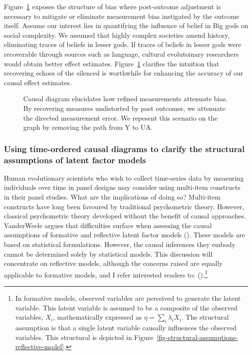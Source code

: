 \documentclass[
  singlecolumn]{article}
\begin{document}
Figure~\ref{fig-dag-measure-selection} exposes the structure of bias
where post-outcome adjustment is necessary to mitigate or eliminate
measurement bias instigated by the outcome itself. Assume our interest
lies in quantifying the influence of belief in Big gods on social
complexity. We assumed that highly complex societies amend history,
eliminating traces of beliefs in lesser gods. If traces of beliefs in
lesser gods were recoverable through sources such as language, cultural
evolutoinary researchers would obtain better effect estimates.
Figure~\ref{fig-dag-measure-selection} clarifies the intuition that
recovering echoes of the silenced is worthwhile for enhancing the
accuracy of our causal effect estimates.

\begin{figure}


\caption{\label{fig-dag-measure-selection}Causal diagram elucidates how
refined measurements attenuate bias. By recovering measures undistorted
by past outcomes, we attenuate the directed measurement error. We
repesent this scenario on the graph by removing the path from Y to UA.}

\end{figure}%

\subsubsection{Using time-ordered causal diagrams to clarify the
structural assumptions of latent factor
models}\label{using-time-ordered-causal-diagrams-to-clarify-the-structural-assumptions-of-latent-factor-models}

Human evolutionary scientists who wish to collect time-series data by
measuring individuals over time in panel designs may consider using
multi-item constructs in their panel studies. What are the implications
of doing so? Multi-item constructs have long been favoured by
traditional psychometric theory. However, classical psychometric theory
developed without the benefit of causal approaches. VanderWeele argues
that difficulties surface when assessing the causal assumptions of
formative and reflective latent factor models
(). These models are
based on statistical formulations. However, the causal inferences they
embody cannot be determined solely by statistical models. This
discussion will concentrate on reflective models, although the concerns
raised are equally applicable to formative models, and I refer
interested readers to: ().\footnote{In formative models, observed variables are perceived
  to generate the latent variable. This latent variable is assumed to be
  a composite of the observed variables, \(X_i\), mathematically
  expressed as \(\eta = \sum_i\lambda_i X_i\). The structural assumption
  is that a single latent variable causally influences the observed
  variables. This structural is depicted in
  Figure~\ref{fig-structural-assumptions-reflective-model}.}
\end{document}
